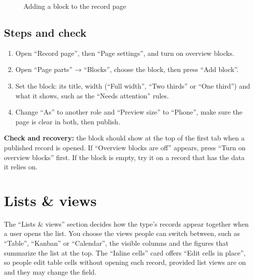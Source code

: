 \begin{figure}[H]
\centering
{}
\rclegend
\caption{Adding a block to the record page}
\label{fig:builder-record-page-blocks-flow}
\end{figure}

\subsection{Steps and check}
\begin{enumerate}
\item Open “Record page”, then “Page settings”, and turn on overview blocks.
\item Open “Page parts” → “Blocks”, choose the block, then press “Add block”.
\item Set the block: its title, width (“Full width”, “Two thirds” or “One third”) and what it shows, such as the “Needs attention” rules.
\item Change “As” to another role and “Preview size” to “Phone”, make sure the page is clear in both, then publish.
\end{enumerate}

\textbf{Check and recovery:} the block should show at the top of the first tab when a published record is opened. If “Overview blocks are off” appears, press “Turn on overview blocks” first. If the block is empty, try it on a record that has the data it relies on.

\clearpage
\section{Lists \& views}
\label{sec:builder-feature-lists}

The “Lists \& views” section decides how the type's records appear together when a user opens the list. You choose the views people can switch between, such as “Table”, “Kanban” or “Calendar”, the visible columns and the figures that summarize the list at the top. The “Inline cells” card offers “Edit cells in place”, so people edit table cells without opening each record, provided list views are on and they may change the field.

